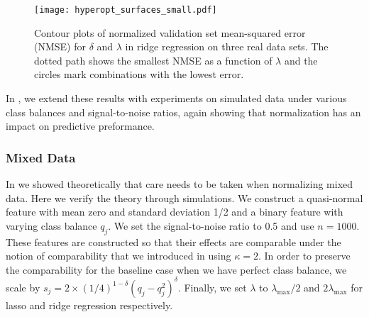 
\begin{figure}[htpb]
  \centering
  \texttt{[image: hyperopt\_surfaces\_small.pdf]}
  \caption{%
    Contour plots of normalized validation set mean-squared error (NMSE)
    for \(\delta\) and \(\lambda\) in ridge regression on
    three real data sets. The
    dotted path shows the smallest NMSE as a function of \(\lambda\) and the circles mark
    combinations with the lowest error.
  }
  \label{fig:hyperopt-contours}
\end{figure}


In , we extend these results with experiments on
simulated data under various class balances and signal-to-noise ratios, again showing that
normalization has an impact on predictive preformance.

\subsubsection{Mixed Data}\label{sec:experiments-mixed-data}

In  we showed theoretically that care needs to be taken when
normalizing mixed data. Here we verify the theory through simulations. We construct a
quasi-normal feature with mean zero and standard deviation 1/2 and a binary feature with
varying class balance \(q_j\). We set the signal-to-noise ratio to 0.5 and use \(n =
\num{1000}\). These features are constructed so that their effects are comparable under the
notion of comparability that we introduced in  using \(\kappa = 2\).
In order to preserve the comparability for the baseline case when we have perfect class
balance, we scale by \(s_j = 2 \times (1/4)^{1-\delta}(q_j-q_j^2)^\delta\). Finally, we set
\(\lambda\) to \(\lambda_\text{max}/2\) and \(2\lambda_\text{max}\) for lasso and ridge
regression respectively.

